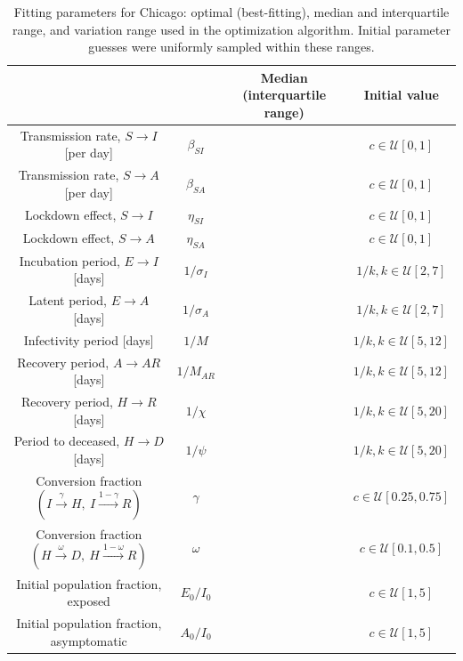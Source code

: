 \documentclass[11pt]{article}
\newcommand{\U}{\mathcal{U}}
\begin{document}
	\begin{table}[h]
		\centering
		\caption{Fitting parameters for Chicago: optimal (best-fitting), median and interquartile range, and variation range used in the optimization algorithm.
			Initial parameter guesses were uniformly sampled within these ranges.}
		\label{tab:parameters}
		\begin{tabular}{ c c c c }
			\hline
			\hline
																								&					&	Median (interquartile range)	&	Initial value \\
			\hline
			Transmission rate, $S \to I$ [per day]												&	$\beta_{SI}$	&									&	$c \in \U [0,1]$ \\
			Transmission rate, $S \to A$ [per day]												&	$\beta_{SA}$	&									& 	$c \in \U [0,1]$ \\
			Lockdown effect, $S \to I$															&	$\eta_{SI}$ 	&									& 	$c \in \U [0,1]$ \\
			Lockdown effect, $S \to A$															&	$\eta_{SA}$		&									& 	$c \in \U [0,1]$ \\
			Incubation period, $E \to I$ [days]													&	$1 / \sigma_I$	&									& 	$1 / k, k \in \U [2,7]$ \\
			Latent period, $E \to A$ [days]														&	$1 / \sigma_A$	&									& 	$1 / k, k \in \U [2,7]$ \\
			Infectivity period [days]															&	$1 / M$			&									& 	$1 / k, k \in \U [5,12]$ \\
			Recovery period, $A \to AR$ [days]													&	$1 / M_{AR}$	&									& 	$1 / k, k \in \U [5,12]$ \\
			Recovery period, $H \to R$ [days]													&	$1 / \chi$		&									& 	$1 / k, k \in \U [5,20]$ \\
			Period to deceased, $H \to D$ [days]												&	$1 / \psi$		&									& 	$1 / k, k \in \U [5,20]$ \\
			Conversion fraction $(I \xrightarrow{\gamma} H, \ I \xrightarrow{1 - \gamma} R)$	&	$\gamma$		&									& 	$c \in \U [0.25,0.75]$ \\
			Conversion fraction $(H \xrightarrow{\omega} D, \ H \xrightarrow{1 - \omega} R)$	&	$\omega$		&									& 	$c \in \U [0.1,0.5]$ \\
			Initial population fraction, exposed												&	$E_0 / I_0$		&									& 	$c \in \U [1,5]$ \\
			Initial population fraction, asymptomatic											&	$A_0 / I_0$		&									& 	$c \in \U [1,5]$ \\
			\hline
			\hline
		\end{tabular}
	\end{table}
\end{document}
